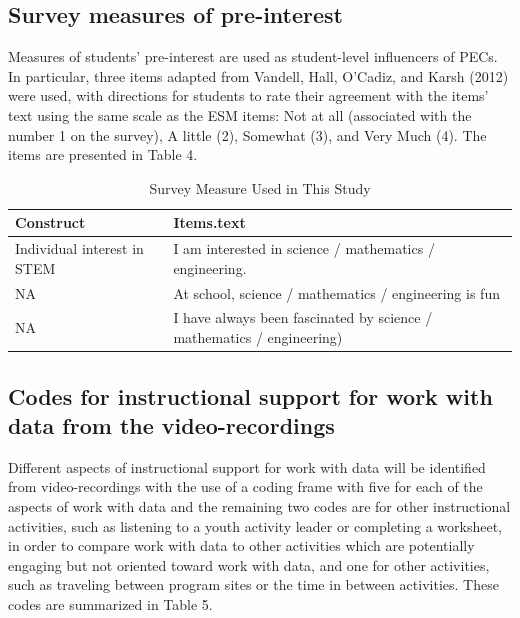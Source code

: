\documentclass[]{book}
\theoremstyle{definition}
\theoremstyle{definition}
\theoremstyle{definition}
\theoremstyle{remark}
\begin{document}
\subsection{Survey measures of
pre-interest}\label{survey-measures-of-pre-interest}

Measures of students' pre-interest are used as student-level influencers
of PECs. In particular, three items adapted from Vandell, Hall, O'Cadiz,
and Karsh (2012) were used, with directions for students to rate their
agreement with the items' text using the same scale as the ESM items:
Not at all (associated with the number 1 on the survey), A little (2),
Somewhat (3), and Very Much (4). The items are presented in Table 4.

\begin{table}

\caption{\label{tab:unnamed-chunk-5}Survey Measure Used in This Study}
\centering
\begin{tabular}[t]{ll}
\toprule
Construct & Items.text\\
\midrule
Individual interest in STEM & I am interested in science / mathematics / engineering.\\
NA & At school, science / mathematics / engineering is fun\\
NA & I have always been fascinated by science / mathematics / engineering)\\
\bottomrule
\end{tabular}
\end{table}

\subsection{Codes for instructional support for work with data from the
video-recordings}\label{codes-for-instructional-support-for-work-with-data-from-the-video-recordings}

Different aspects of instructional support for work with data will be
identified from video-recordings with the use of a coding frame with
five for each of the aspects of work with data and the remaining two
codes are for other instructional activities, such as listening to a
youth activity leader or completing a worksheet, in order to compare
work with data to other activities which are potentially engaging but
not oriented toward work with data, and one for other activities, such
as traveling between program sites or the time in between activities.
These codes are summarized in Table 5.
\end{document}
